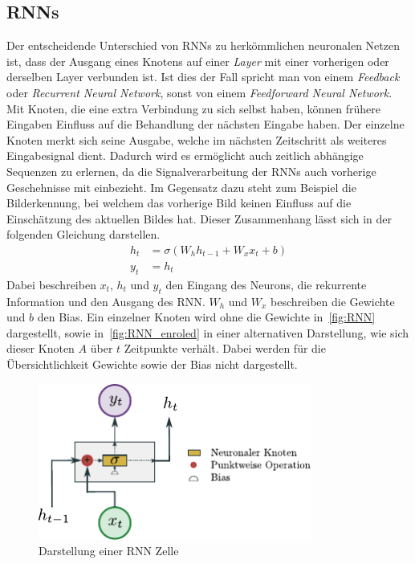         \subsection{\aclp{RNN}}\label{sec:RNN}
        Der entscheidende Unterschied von \acp{RNN} zu herkömmlichen neuronalen Netzen ist,
            dass der Ausgang eines Knotens auf einer \textit{Layer}  mit einer vorherigen oder derselben Layer verbunden ist.
            Ist dies der Fall spricht man von einem \textit{Feedback} oder \textit{Recurrent Neural Network}, sonst von einem \textit{Feedforward Neural Network}. 
            Mit Knoten, die eine extra Verbindung zu sich selbst haben, können frühere Eingaben Einfluss auf die Behandlung der nächsten Eingabe haben.
            Der einzelne Knoten merkt sich seine Ausgabe, welche im nächsten Zeitschritt als weiteres Eingabesignal dient.
        Dadurch wird es ermöglicht auch zeitlich abhängige Sequenzen zu erlernen, da die Signalverarbeitung der \acp{RNN} auch vorherige Geschehnisse mit einbezieht.
            Im Gegensatz dazu steht zum Beispiel die Bilderkennung, bei welchem das vorherige Bild keinen Einfluss auf die Einschätzung des aktuellen Bildes hat.
            Dieser Zusammenhang lässt sich in der folgenden Gleichung darstellen.
            \begin{equation}
                \begin{split}
                    h_t &= \sigma \left(W_{h}h_{t-1} + W_{x}x_{t} + b\right)\\
                    y_t &= h_t
                \end{split}
            \end{equation}
            Dabei beschreiben $x_t$, $h_t$ und $y_t$ den Eingang des Neurons, die rekurrente Information und den Ausgang des \ac{RNN}\@.
            $W_h$ und  $W_x$ beschreiben die Gewichte und $b$ den Bias.
            Ein einzelner Knoten wird ohne die Gewichte in~\autoref{fig:RNN} dargestellt,
            sowie in~\autoref{fig:RNN_enroled} in einer alternativen Darstellung, wie sich dieser Knoten $A$ über $t$ Zeitpunkte verhält.
            Dabei werden für die Übersichtlichkeit Gewichte sowie der Bias nicht dargestellt.
                \begin{figure}[ht]
                    \centering
                    \includegraphics[width=0.8\textwidth]{images/Illustrationen/RNN_simple}
                    \caption{Darstellung einer \ac{RNN} Zelle}
                    \label{fig:RNN}
                \end{figure}
